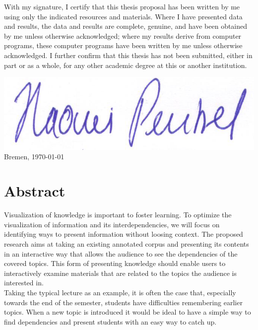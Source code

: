 \documentclass[twoside, 12pt]{article}
\begin{document}
\newpage
\noindent
  With my signature, I certify that this thesis proposal has been written by me
  using only the indicated resources and materials. Where I have
  presented data and results, the data and results are complete,
  genuine, and have been obtained by me unless otherwise acknowledged;
  where my results derive from computer programs, these computer
  programs have been written by me unless otherwise acknowledged. I
  further confirm that this thesis has not been submitted, either in
  part or as a whole, for any other academic degree at this or another
  institution.

  \vspace{20mm}

    \includegraphics[scale=0.2]{assets/Signature}
 \hfill Bremen, \today
  
\newpage

\thispagestyle{fancy} %


 \section*{Abstract}
 \label{sec:abstract}
Visualization of knowledge is important to foster learning. To optimize the visualization of information and its interdependencies, we will focus on identifying ways to present information without loosing context. The proposed research aims at taking an existing annotated corpus and presenting its contents in an interactive way that allows the audience to see the dependencies of the covered topics. This form of presenting knowledge should enable users to interactively examine materials that are related to the topics the audience is interested in.\\

Taking the typical lecture as an example, it is often the case that, especially towards the end of the semester, students have difficulties remembering earlier topics. When a new topic is introduced it would be ideal to have a simple way to find dependencies and present students with an easy way to catch up.\\
\end{document}
